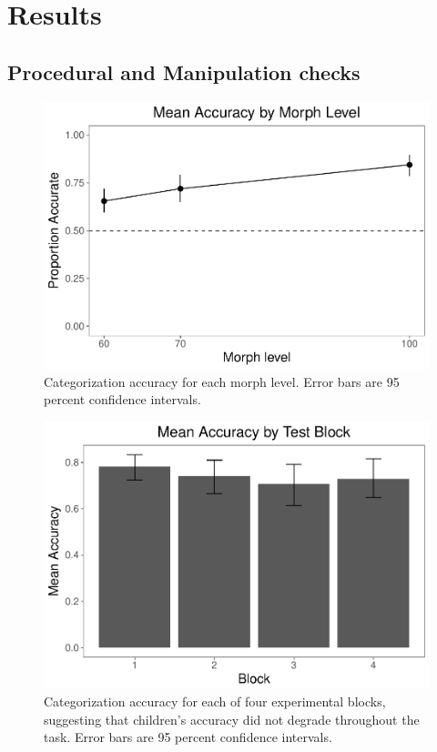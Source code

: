 \documentclass[floatsintext,man]{apa6}
\theoremstyle{definition}
\theoremstyle{definition}
\theoremstyle{definition}
\theoremstyle{remark}
\begin{document}
\section{Results}\label{results}

\subsection{Procedural and Manipulation
checks}\label{procedural-and-manipulation-checks}

\begin{figure}
\centering
\includegraphics{soc_ref_category_paper_files/figure-latex/morphaccuracy-1.pdf}
\caption{\label{fig:morphaccuracy}Categorization accuracy for each morph
level. Error bars are 95 percent confidence intervals.}
\end{figure}

\begin{figure}
\centering
\includegraphics{soc_ref_category_paper_files/figure-latex/blockaccuracy-1.pdf}
\caption{\label{fig:blockaccuracy}Categorization accuracy for each of four
experimental blocks, suggesting that children's accuracy did not degrade
throughout the task. Error bars are 95 percent confidence intervals.}
\end{figure}
\end{document}
